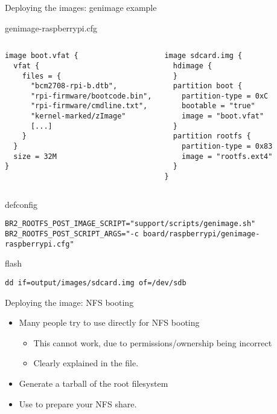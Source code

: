\begin{frame}[fragile]{Deploying the images: genimage example}
\begin{block}{genimage-raspberrypi.cfg}
\begin{columns}
{\tiny
  \begin{verbatim}
image boot.vfat {
  vfat {
    files = {
      "bcm2708-rpi-b.dtb",
      "rpi-firmware/bootcode.bin",
      "rpi-firmware/cmdline.txt",
      "kernel-marked/zImage"
      [...]
    }
  }
  size = 32M
}
\end{verbatim}
}
{\tiny
\begin{verbatim}
image sdcard.img {
  hdimage {
  }
  partition boot {
    partition-type = 0xC
    bootable = "true"
    image = "boot.vfat"
  }
  partition rootfs {
    partition-type = 0x83
    image = "rootfs.ext4"
  }
}
 \end{verbatim}
}
\end{columns}
\end{block}

\begin{block}{defconfig}
{\tiny
  \begin{verbatim}
BR2_ROOTFS_POST_IMAGE_SCRIPT="support/scripts/genimage.sh"
BR2_ROOTFS_POST_SCRIPT_ARGS="-c board/raspberrypi/genimage-raspberrypi.cfg"
\end{verbatim}
}
\end{block}

\begin{block}{flash}
{\tiny
  \begin{verbatim}
dd if=output/images/sdcard.img of=/dev/sdb
\end{verbatim}
}
\end{block}

\end{frame}

\begin{frame}{Deploying the image: NFS booting}
  \begin{itemize}
  \item Many people try to use  directly for NFS booting
    \begin{itemize}
    \item This cannot work, due to permissions/ownership being
      incorrect
    \item Clearly explained in the
       file.
    \end{itemize}
  \item Generate a tarball of the root filesystem
  \item Use  to
    prepare your NFS share.
  \end{itemize}
\end{frame}

